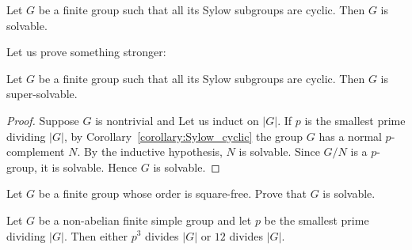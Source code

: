 
\begin{exercise}
	Let $G$ be a finite group such that all its Sylow subgroups are cyclic. Then $G$ is solvable.
\end{exercise}

Let us prove something stronger:

\begin{proposition}
	\label{pro:Sylow_cyclic:solvable}
	Let $G$ be a finite group such that all its Sylow subgroups are cyclic. Then $G$ is super-solvable.   
\end{proposition}

\begin{proof}
	Suppose $G$ is nontrivial and Let us induct on $|G|$. If $p$ is the smallest prime dividing $|G|$, by Corollary~\ref{corollary:Sylow_cyclic} the group $G$ has a normal $p$-complement $N$. By the inductive hypothesis, $N$ is solvable. Since $G/N$ is a $p$-group, it is solvable. Hence $G$ is solvable.
\end{proof}

\begin{exercise}  
\label{xca:square-free}
	Let $G$ be a finite group whose order is square-free. Prove that
    $G$ is solvable. 
\end{exercise}


\begin{corollary}
	Let $G$ be a non-abelian finite simple group and let $p$ be the smallest prime dividing $|G|$. Then either $p^3$ divides $|G|$ or $12$ divides $|G|$.
\end{corollary}

